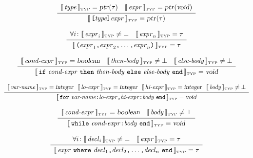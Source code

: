 \documentclass[10pt]{article}
\begin{document}
$$ \begin{array}{c}
   [\![\,\mbox{\textit{type}}\,]\!]_{\mbox{\tiny TYP}} = \mbox{\textsl{ptr}}(\tau) \quad
   [\![\,\mbox{\textit{expr}}\,]\!]_{\mbox{\tiny TYP}} = \mbox{\textsl{ptr}}(\mbox{\textsl{void}})
   \\[2pt]\hline\\[-10pt]
   [\![\,\mbox{\texttt{[}}\mbox{\textit{type}}\mbox{\texttt{]}}\mbox{\textit{expr}}\,]\!]_{\mbox{\tiny TYP}} = \mbox{\textsl{ptr}}(\tau)
   \end{array} $$

$$ \begin{array}{c}
   \forall i\colon[\![\,\mbox{\textit{expr}}_i\,]\!]_{\mbox{\tiny TYP}} \not=\bot \quad
   [\![\,\mbox{\textit{expr}}_n\,]\!]_{\mbox{\tiny TYP}} = \tau
   \\[2pt]\hline\\[-10pt]
   [\![\,\mbox{\texttt{(}}\mbox{\textit{expr}}_1\mbox{\texttt{,}}\mbox{\textit{expr}}_2\mbox{\texttt{,}}\ldots\mbox{\texttt{,}}\mbox{\textit{expr}}_n\mbox{\texttt{)}}\,]\!]_{\mbox{\tiny TYP}} = \tau
   \end{array} $$

$$ \begin{array}{c}
   \typattr{\nont{cond-expr}} = \type{boolean} \quad
   \typattr{\nont{then-body}} \not= \bot \quad
   \typattr{\nont{else-body}} \not= \bot
   \\[2pt]\hline\\[-10pt]
   \typattr{\term{if}\ \nont{cond-expr}\ \term{then}\ \nont{then-body}\ \term{else}\ \nont{else-body}\ \term{end}} = \type{void}
   \end{array} $$

$$ \begin{array}{c}
   \typattr{\nont{var-name}} = \type{integer} \!\!\quad
   \typattr{\nont{lo-expr}} = \type{integer} \!\!\quad
   \typattr{\nont{hi-expr}} = \type{integer} \!\!\quad
   \typattr{\nont{body}} \not= \bot
   \\[2pt]\hline\\[-10pt]
   \typattr{\term{for}\ \nont{var-name}\term{:}\nont{lo-expr}\term{,}\nont{hi-expr}\term{:}\nont{body}\ \term{end}} = \type{void}
   \end{array} $$

$$ \begin{array}{c}
   \typattr{\nont{cond-expr}} = \type{boolean} \quad
   \typattr{\nont{body}} \not= \bot
   \\[2pt]\hline\\[-10pt]
   \typattr{\term{while}\ \nont{cond-expr}\term{:}\nont{body}\ \term{end}} = \type{void}
   \end{array} $$
   
$$ \begin{array}{c}
   \forall i\colon \typattr{\nont{decl}_i} \not= \bot \quad
   \typattr{\nont{expr}} = \tau
   \\[2pt]\hline\\[-10pt]
   \typattr{\nont{expr}\ \term{where}\  \nont{decl}_1\term{,}\nont{decl}_2\term{,}\ldots\term{,}\nont{decl}_n\ \term{end}} = \tau
   \end{array} $$
\end{document}
